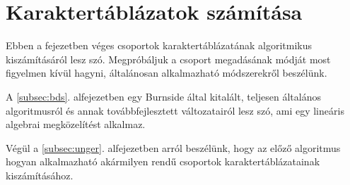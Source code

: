 \section{Karaktertáblázatok számítása}
\label{sec:karakter}
Ebben a fejezetben véges csoportok karaktertáblázatának algoritmikus kiszámításáról lesz szó.
Megpróbáljuk a csoport megadásának módját most figyelmen kívül hagyni, általánosan alkalmazható
módszerekről beszélünk.

A \ref{subsec:bds}. alfejezetben egy Burnside által kitalált, teljesen általános algoritmusról
és annak továbbfejlesztett változatairól lesz szó, ami egy lineáris algebrai megközelítést alkalmaz.


Végül a \ref{subsec:unger}. alfejezetben arról beszélünk, hogy az előző algoritmus hogyan alkalmazható
akármilyen rendű csoportok karaktertáblázatainak kiszámításához.


